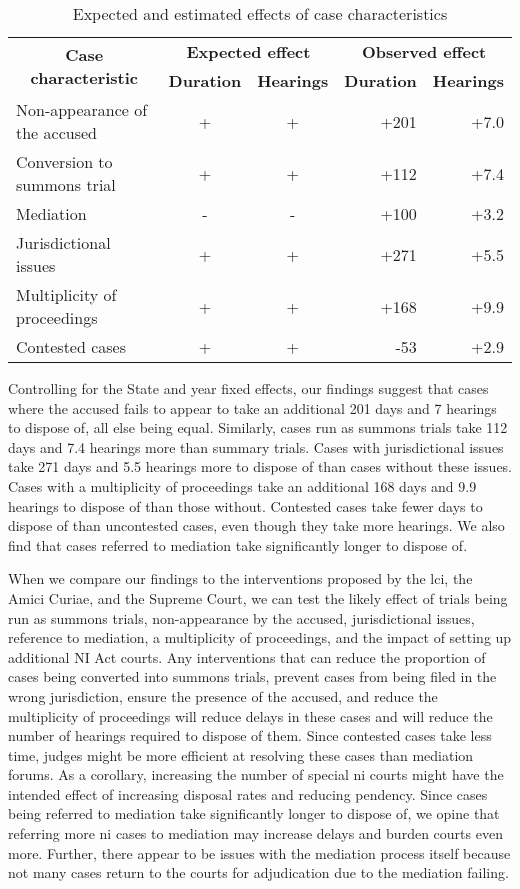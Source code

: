 \documentclass[12pt,a4paper]{article}
\begin{document}
\begin{table}[!ht]
\caption{Expected and estimated effects of case characteristics}
\label{tab:observed}
\centering
\footnotesize
\begin{tabular}{lcc|rr}
\toprule
\multicolumn{1}{c}{\multirow{2}{*}{\textbf{Case characteristic}}} & \multicolumn{2}{c}{\textbf{Expected effect}} & \multicolumn{2}{c}{\textbf{Observed effect}} \\ \cmidrule(l){2-5}
\multicolumn{1}{c}{} & \textbf{Duration} & \textbf{Hearings} & \textbf{Duration} & \textbf{Hearings}\\ \midrule
Non-appearance of the accused & + & + & +201 & +7.0 \\
Conversion to summons trial & + & + & +112 & +7.4\\
Mediation & - & - & +100 & +3.2 \\
Jurisdictional issues & + & + & +271 & +5.5 \\
Multiplicity of proceedings & + & + & +168 & +9.9\\
Contested cases & + & + & -53 & +2.9\\ \bottomrule
\end{tabular}
\end{table}

Controlling for the State and year fixed effects, our findings suggest that cases where the accused fails to appear to take an additional 201 days and 7 hearings to dispose of, all else being equal. Similarly, cases run as summons trials take 112 days and 7.4 hearings more than summary trials. Cases with jurisdictional issues take 271 days and 5.5 hearings more to dispose of than cases without these issues. Cases with a multiplicity of proceedings take an additional 168 days and 9.9 hearings to dispose of than those without. Contested cases take fewer days to dispose of than uncontested cases, even though they take more hearings. We also find that cases referred to mediation take significantly longer to dispose of.

When we compare our findings to the interventions proposed by the \gls{lci}, the Amici Curiae, and the Supreme Court, we can test the likely effect of trials being run as summons trials, non-appearance by the accused, jurisdictional issues, reference to mediation, a multiplicity of proceedings, and the impact of setting up additional NI Act courts. Any interventions that can reduce the proportion of cases being converted into summons trials, prevent cases from being filed in the wrong jurisdiction, ensure the presence of the accused, and reduce the multiplicity of proceedings will reduce delays in these cases and will reduce the number of hearings required to dispose of them. Since contested cases take less time, judges might be more efficient at resolving these cases than mediation forums. As a corollary, increasing the number of special \gls{ni} courts might have the intended effect of increasing disposal rates and reducing pendency. Since cases being referred to mediation take significantly longer to dispose of, we opine that referring more \gls{ni} cases to mediation may increase delays and burden courts even more. Further, there appear to be issues with the mediation process itself because not many cases return to the courts for adjudication due to the mediation failing.
\end{document}
